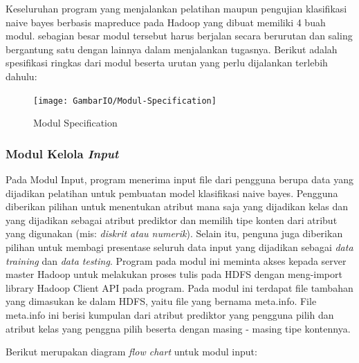 Keseluruhan program yang menjalankan pelatihan maupun pengujian klasifikasi naive bayes berbasis mapreduce pada Hadoop yang dibuat memiliki 4 buah modul. sebagian besar modul tersebut harus berjalan secara berurutan dan saling bergantung satu dengan lainnya dalam menjalankan tugasnya. Berikut adalah spesifikasi ringkas dari modul beserta urutan yang perlu dijalankan terlebih dahulu: 

\begin{figure}[H]
	\centering
	\texttt{[image: GambarIO/Modul-Specification]}
	\caption[Modul-Specification]{Modul Specification}
	\label{fig:Modul Specification}
\end{figure}

\subsubsection{Modul Kelola \textit{Input}}

Pada Modul Input, program menerima input file dari pengguna berupa data yang dijadikan pelatihan untuk pembuatan model klasifikasi naive bayes. Pengguna diberikan pilihan untuk menentukan atribut mana saja yang dijadikan kelas dan yang dijadikan sebagai atribut prediktor dan memilih tipe konten dari atribut yang digunakan (mis: \textit{diskrit atau numerik}). Selain itu, penguna juga diberikan pilihan untuk membagi presentase seluruh data input yang dijadikan sebagai \textit{data training} dan \textit{data testing}. Program pada modul ini meminta akses kepada server master Hadoop untuk melakukan proses tulis pada HDFS dengan meng-import library Hadoop Client API pada program. Pada modul ini terdapat file tambahan yang dimasukan ke dalam HDFS, yaitu file yang bernama meta.info. File meta.info ini berisi kumpulan dari atribut prediktor yang pengguna pilih dan atribut kelas yang penggna pilih beserta dengan masing - masing tipe kontennya.

Berikut merupakan diagram \textit{flow chart} untuk modul input:

